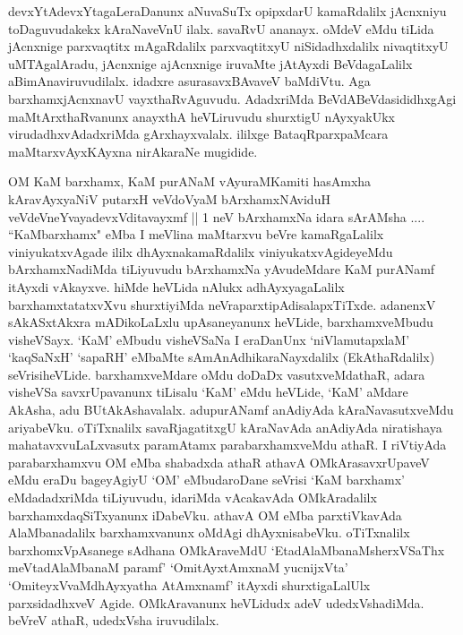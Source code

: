 \begin{artha}
devxYtAdevxYtagaLeraDanunx aNuvaSuTx opipxdarU kamaRdalilx jAcnxniyu toDaguvudakekx kAraNaveVnU ilalx. savaRvU ananayx. oMdeV eMdu tiLida jAcnxnige parxvaqtitx mAgaRdalilx parxvaqtitxyU niSidadhxdalilx nivaqtitxyU uMTAgalAradu, jAcnxnige \-ajAcnxnige iruvaMte jAtAyxdi BeVdagaLalilx aBimAnaviruvudilalx. idadxre asurasavxBAvaveV baMdiVtu. Aga barxhamxjAcnxnavU vayxthaRvAguvudu. AdadxriMda BeVdABeVdasididhxgAgi maMtArxthaRvanunx anayxthA heVLiruvudu shurxtigU nAyxyakUkx virudadhxvAdadxriMda gArxhayxvalalx. ililxge BataqRparxpaMcara maMtarxvAyxKAyxna nirAkaraNe mugidide.
\end{artha}


\begin{artha}
OM KaM barxhamx, KaM purANaM vAyuraMKamiti hasAmxha kAravAyxyaNiV putarxH veVdoVyaM bArxhamxNAviduH veVdeVneYvayadevxVdi\-tavayxmf || 1 neV bArxhamxNa idara sArAMsha .... ``KaMbarxhamx"  eMba I meVlina maMtarxvu beVre kamaRgaLalilx viniyukatxvAgade ililx dhAyxnakamaRdalilx viniyukatxvAgideyeMdu bArxhamxNadiMda tiLiyuvudu bArxhamxNa yAvudeMdare KaM purANamf itAyxdi vAkayxve. hiMde heVLida nAlukx adhAyxyagaLalilx barxhamxtatatxvXvu shurxtiyiMda neVraparxtipAdisalapxTiTxde. adanenxV sAkASxtAkxra mADikoLaLxlu upAsaneyanunx heVLide, barxhamxveMbudu visheVSayx. `KaM' eMbudu visheVSaNa I eraDanUnx `niVlamutapxlaM' `kaqSaNxH' `sapaRH' eMbaMte sAmAnAdhi\-karaNayxdalilx (EkAthaRdalilx) seVrisiheVLide. barxhamxveMdare oMdu doDaDx vasutxveMdathaR, adara visheVSa savxrUpavanunx tiLisalu `KaM' eMdu heVLide, `KaM' aMdare AkAsha, adu BUtAkAshavalalx. adu\break purANamf anAdiyAda kAraNavasutxveMdu ariyabeVku. oTiTxnalilx savaRjagatitxgU kAraNavAda anAdiyAda niratishaya mahatavxvuLaLxvasutx paramAtamx parabarxhamxveMdu athaR. I riVtiyAda parabarxhamxvu OM eMba shabadxda athaR athavA OMkArasavxrUpaveV eMdu eraDu bageyAgiyU `OM' eMbudaroDane seVrisi `KaM barxhamx' eMdadadxriMda tiLiyuvudu, idariMda vAcakavAda OMkAradalilx barxhamxdaqSiTxyanunx iDabeVku. athavA OM eMba parxtiVkavAda AlaMbanadalilx barxhamxvanunx oMdAgi dhAyxnisabeVku. oTiTxnalilx barxhomxVpAsanege sAdhana OMkAraveMdU `EtadAlaMbanaMsherxVSaThx meVtadAlaMbanaM paramf' `OmitAyxtAmxnaM yucnijxVta' `OmiteyxVvaMdhAyxyatha AtAmxnamf' itAyxdi shurxtigaLalUlx parxsidadhxveV Agide. OMkAravanunx heVLidudx adeV udedxVshadiMda. beVreV athaR, udedxVsha iruvudilalx.
\end{artha}

